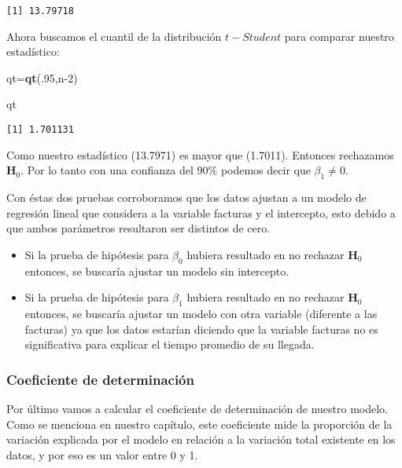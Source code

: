 \documentclass[
  a4paper,
  oneside,
  openany]{book}
\newenvironment{Shaded}{\begin{snugshade}}{\end{snugshade}}
\newcommand{\DecValTok}[1]{\textcolor[rgb]{0.00,0.00,0.81}{#1}}
\newcommand{\FunctionTok}[1]{\textcolor[rgb]{0.13,0.29,0.53}{\textbf{#1}}}
\newcommand{\NormalTok}[1]{#1}
\newcommand{\OtherTok}[1]{\textcolor[rgb]{0.56,0.35,0.01}{#1}}
\begin{document}
\begin{verbatim}
[1] 13.79718
\end{verbatim}

Ahora buscamos el cuantil de la distribución \(t-Student\) para comparar nuestro estadístico:

\begin{Shaded}
\begin{Highlighting}[]
\NormalTok{qt}\OtherTok{=}\FunctionTok{qt}\NormalTok{(.}\DecValTok{95}\NormalTok{,n}\DecValTok{{-}2}\NormalTok{) }

\NormalTok{qt}
\end{Highlighting}
\end{Shaded}

\begin{verbatim}
[1] 1.701131
\end{verbatim}

Como nuestro estadístico (13.7971) es mayor que (1.7011). Entonces rechazamos \(\textbf{H}_0\). Por lo tanto con una confianza del \(90\%\) podemos decir que \(\beta_{1} \neq 0.\)

Con éstas dos pruebas corroboramos que los datos ajustan a un modelo de regresión lineal que considera a la variable facturas y el intercepto, esto debido a que ambos parámetros resultaron ser distintos de cero.

\begin{itemize}
\item
  Si la prueba de hipótesis para \(\beta_{0 }\) hubiera resultado en no rechazar \(\textbf{H}_0\) entonces, se buscaría ajustar un modelo sin intercepto.
\item
  Si la prueba de hipótesis para \(\beta_{1}\) hubiera resultado en no rechazar \(\textbf{H}_0\) entonces, se buscaría ajustar un modelo con otra variable (diferente a las facturas) ya que los datos estarían diciendo que la variable facturas no es significativa para explicar el tiempo promedio de su llegada.
\end{itemize}

\hypertarget{coeficiente-de-determinaciuxf3n-1}{%
\subsubsection*{Coeficiente de determinación}\label{coeficiente-de-determinaciuxf3n-1}}


Por último vamos a calcular el coeficiente de determinación de nuestro modelo. Como se menciona en nuestro capítulo, este coeficiente mide la proporción de la variación explicada por el modelo en relación a la variación total existente en los datos, y por eso es un valor entre 0 y 1.
\end{document}
